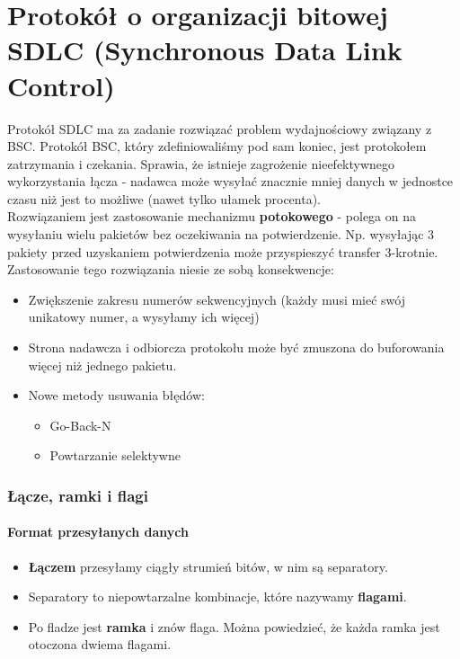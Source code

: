 \part{Protokół o organizacji bitowej SDLC (Synchronous Data Link Control)}
	Protokół SDLC ma za zadanie rozwiązać problem wydajnościowy związany z BSC. Protokół BSC, który zdefiniowaliśmy pod sam koniec, jest protokołem zatrzymania i czekania. Sprawia, że istnieje zagrożenie nieefektywnego wykorzystania łącza - nadawca może wysyłać znacznie mniej danych w jednostce czasu niż jest to możliwe (nawet tylko ułamek procenta).\\
	Rozwiązaniem jest zastosowanie mechanizmu \textbf{potokowego} - polega on na wysyłaniu wielu pakietów bez oczekiwania na potwierdzenie. Np. wysyłając 3 pakiety przed uzyskaniem potwierdzenia może przyspieszyć transfer 3-krotnie.\\
	Zastosowanie tego rozwiązania niesie ze sobą konsekwencje:
	\begin{itemize}
		\item Zwiększenie zakresu numerów sekwencyjnych (każdy musi mieć swój unikatowy numer, a wysyłamy ich więcej)
		\item Strona nadawcza i odbiorcza protokołu może być zmuszona do buforowania więcej niż jednego pakietu.
		\item Nowe metody usuwania błędów:
		\begin{itemize}
			\item Go-Back-N
			\item Powtarzanie selektywne
		\end{itemize}
	\end{itemize}
	\section{Łącze, ramki i flagi}
		\subsection{Format przesyłanych danych}
			\begin{itemize}
				\item \textbf{Łączem} przesyłamy ciągły strumień bitów, w nim są separatory.
				\item Separatory to niepowtarzalne kombinacje, które nazywamy \textbf{flagami}.
				\item Po fladze jest \textbf{ramka} i znów flaga. Można powiedzieć, że każda ramka jest otoczona dwiema flagami.
			\end{itemize}
